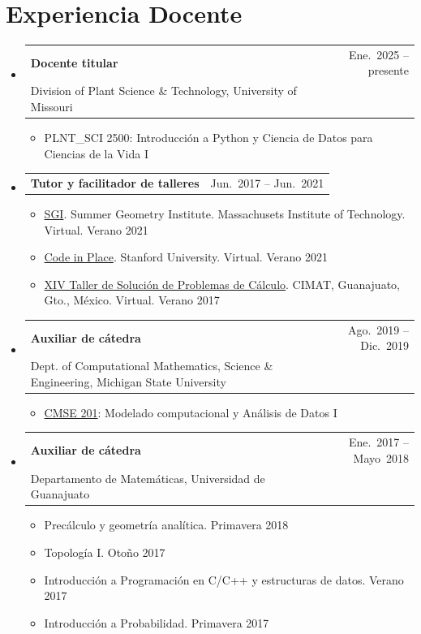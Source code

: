 \documentclass[A4,11pt]{article}
\makeatletter
\newcommand{\CVItem}[1]{
	\item\small{
		{#1 \vspace{-2pt}}
	}
}
\newcommand{\CVPubheading}[2]{
	\vspace{-0.5ex}\item
	\begin{tabular*}{0.97\textwidth}[t]{l@{\extracolsep{\fill}}r}
		\textbf{#1} & #2 \\
	\end{tabular*}\vspace{-1.5ex}
}
\newcommand{\CVSubheading}[4]{
	\vspace{-0.5ex}\item
	\begin{tabular*}{0.97\textwidth}[t]{l@{\extracolsep{\fill}}r}
		\textbf{#1} & #2 \\
		\small#3 & \small #4 \\
	\end{tabular*}\vspace{-1.5ex}
}
\newcommand{\CVSubHeadingListStart}{\begin{itemize}[leftmargin=0.5cm, label={}]}
\newcommand{\CVSubHeadingListEnd}{\end{itemize}}
\newcommand{\CVItemListStart}{\begin{itemize}}
\newcommand{\CVItemListEnd}{\end{itemize}\vspace{-5pt}}
\makeatother
\begin{document}
		\section{Experiencia Docente}
		\CVSubHeadingListStart
		\CVSubheading
		{Docente titular}{Ene.~2025 -- presente}
		{Division of Plant Science \& Technology, University of Missouri}{}
		\CVItemListStart
		\CVItem{PLNT\_SCI 2500: Introducci\'on a Python y Ciencia de Datos para Ciencias de la Vida I}
		\CVItemListEnd
		\CVPubheading{Tutor y facilitador de talleres}{Jun.~2017 -- Jun.~2021}
		\CVItemListStart
		\CVItem{\hyperref{https://sgi.mit.edu/}{}{}{SGI}. Summer Geometry Institute. Massachusets Institute of Technology. Virtual. Verano 2021}
		\CVItem{\hyperref{https://codeinplace.stanford.edu/}{}{}{Code in Place}. Stanford University. Virtual. Verano 2021}
		\CVItem{\hyperref{https://tallerdecalculo2017.eventos.cimat.mx/}{}{}{XIV Taller de Soluci\'on de Problemas de C\'alculo}. CIMAT, Guanajuato, Gto., M\'exico. Virtual. Verano 2017}
		\CVItemListEnd
		\CVSubheading
		{Auxiliar de c\'atedra}{Ago.~2019 -- Dic.~2019}
		{Dept. of Computational Mathematics, Science \& Engineering, Michigan State University}{}
		\CVItemListStart
		\CVItem{\hyperref{https://msu-cmse-courses.github.io/cmse201-S24-jb/Course_Materials-201/Syllabus/syllabus.html}{}{}{CMSE 201}: Modelado computacional y An\'alisis de Datos I}
		\CVItemListEnd
		\CVSubheading
		{Auxiliar de c\'atedra}{Ene.~2017 -- Mayo~2018}
		{Departamento de Matem\'aticas, Universidad de Guanajuato}{}
		\CVItemListStart
		\CVItem{Prec\'alculo y geometr\'ia anal\'itica. Primavera 2018}
		\CVItem{Topolog\'ia I. Oto\~no 2017}
		\CVItem{Introducci\'on a Programaci\'on en C/C++ y estructuras de datos. Verano 2017}
		\CVItem{Introducci\'on a Probabilidad. Primavera 2017}
		\CVItemListEnd
		\CVSubHeadingListEnd
		
\end{document}
